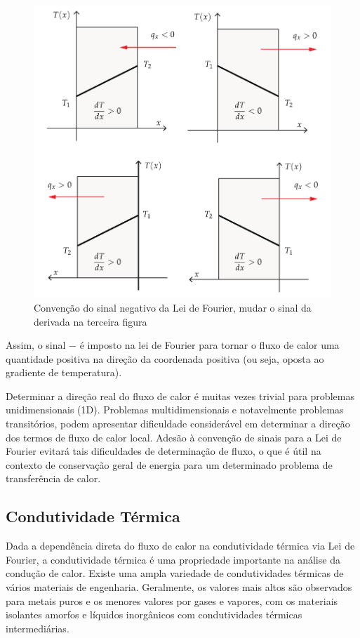 \begin{figure}[H]
\centering
\includegraphics[scale=0.8]{figuras/cap1/fluxo.pdf}
\caption{Convenção do sinal negativo da Lei de Fourier, mudar o sinal da derivada na terceira figura}
\label{fig:sinal}
\end{figure}

Assim, o sinal $-$ é imposto na lei de Fourier para tornar o fluxo de calor uma quantidade positiva na direção da coordenada positiva (ou seja, oposta ao gradiente de temperatura).

Determinar a direção real do fluxo de calor é muitas vezes trivial para problemas unidimensionais (1D). Problemas multidimensionais e notavelmente problemas transitórios, podem apresentar dificuldade considerável em determinar a direção dos termos de fluxo de calor local. Adesão à convenção de sinais para a Lei de Fourier evitará tais dificuldades de determinação de fluxo, o que é útil na contexto de conservação geral de energia para um determinado problema de transferência de calor.

\subsection{Condutividade Térmica}
Dada a dependência direta do fluxo de calor na condutividade térmica via Lei de Fourier, a condutividade térmica é uma propriedade importante na análise da condução de calor. Existe uma ampla variedade de condutividades térmicas de vários
materiais de engenharia. Geralmente, os valores mais altos são observados para metais puros e os menores valores por gases e vapores, com os materiais isolantes amorfos e líquidos inorgânicos com condutividades térmicas intermediárias. 

